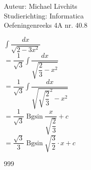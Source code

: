 \documentclass[a4paper]{article}
\begin{document}
  
\noindent \large Auteur: Michael Livchits \\
\noindent \large Studierichting:  Informatica\\
\noindent \large Oefeningenreeks 4A nr. 40.8\\

\medskip

\normalsize

$  \displaystyle\int\dfrac{dx}{\sqrt{2 - 3x^2}}$\\

$ = \dfrac{1}{\sqrt{3}}\displaystyle\int\dfrac{dx}{\sqrt{\dfrac{2}{3} - x^2}}$\\

$ = \dfrac{1}{\sqrt{3}}\displaystyle\int\dfrac{dx}{\sqrt{\sqrt{\dfrac{2}{3}}^2 - x^2}}$\\

$ = \dfrac{1}{\sqrt{3}}\operatorname{Bgsin}\dfrac{x}{\sqrt{\dfrac{2}{3}}} + c $\\

$ = \dfrac{\sqrt{3}}{3}\operatorname{Bgsin}\sqrt{\dfrac{3}{2}}\cdot x + c $\\

\begin{thebibliography}{999}
\end{thebibliography}
\end{document}
